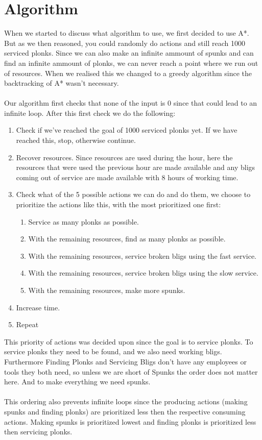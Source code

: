 \documentclass{article}
\begin{document}
\section*{Algorithm}
When we started to discuss what algorithm to use, we first decided to use A*. But as we then reasoned, you could randomly do actions and still reach 1000 serviced plonks. Since we can also make an infinite ammount of spunks and can find an infinite ammount of plonks, we can never reach a point where we run out of resources. When we realised this we changed to a greedy algorithm since the backtracking of A* wasn't necessary.
\\ \\
Our algorithm first checks that none of the input is 0 since that could lead to an infinite loop. After this first check we do the following:
\begin{enumerate}
	\item Check if we've reached the goal of 1000 serviced plonks yet. If we have reached this, stop, otherwise continue.
	\item Recover resources. Since resources are used during the hour, here the resources that were used the previous hour are made available and any bligs coming out of service are made available with 8 hours of working time.
	\item Check what of the 5 possible actions we can do and do them, we choose to prioritize the actions like this, with the most prioritized one first:
	\begin{enumerate}
		\item Service as many plonks as possible.
		\item With the remaining resources, find as many plonks as possible.
		\item With the remaining resources, service broken bligs using the fast service.
		\item With the remaining resources, service broken bligs using the slow service.
		\item With the remaining resources, make more spunks.
	\end{enumerate}
	\item Increase time.
	\item Repeat
\end{enumerate}

This priority of actions was decided upon since the goal is to service plonks. To service plonks they need to be found, and we also need working bligs. Furthermore Finding Plonks and Servicing Bligs don't have any employees or tools they both need, so unless we are short of Spunks the order does not matter here. And to make everything we need spunks. 
\\ \\
This ordering also prevents infinite loops since the producing actions (making spunks and finding plonks) are prioritized less then the respective consuming actions. Making spunks is prioritized lowest and finding plonks is prioritized less then servicing plonks.
\end{document}
